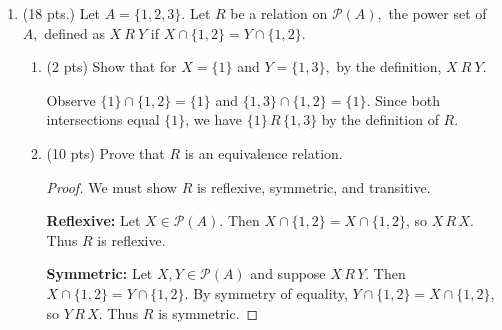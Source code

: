 \documentclass[11pt]{article}
\newcommand{\Z}{{\mathbb{Z}}}
\newcommand{\N}{{\mathbb{N}}}
\begin{document}
\begin{enumerate}
\begin{enumerate}
	\textbf{Disproof by counterexample:} Let $A = \{1\}$, $B = \{1, 2\}$, $C = \{2\}$ (within some universal set, say $U = \{1,2,3\}$). Then $A \subseteq B$. Now $B \cap C = \{2\}$, so $\overline{(B\cap C)} = \{1,3\}$. Thus $A \cap \overline{(B\cap C)} = \{1\} \cap \{1,3\} = \{1\} \neq \emptyset$. Therefore the statement is false.
	\vfill
	\item For every $n \in \N$, there exists some $m \in \N$ such that $mn \equiv 1 \pmod {10}.$
	
	\textbf{Disproof by counterexample:} Let $n = 2$. Suppose for contradiction there exists $m \in \N$ with $2m \equiv 1 \pmod{10}$. Then $10 \mid (2m - 1)$, so $2m - 1$ is divisible by $10$, hence even. But $2m - 1$ is odd, a contradiction. Thus no such $m$ exists for $n = 2$, and the statement is false.
	\vfill
	\item The relation $R$ on $\Z$ defined by $xRy$ if $|x-y| <5$ is transitive.
	
	\textbf{Disproof by counterexample:} Let $x = 0$, $y = 4$, and $z = 8$. Then $|x - y| = 4 < 5$, so $x\,R\,y$. Also $|y - z| = 4 < 5$, so $y\,R\,z$. However, $|x - z| = 8 \not< 5$, so $x\,\not R\,z$. Therefore $R$ is not transitive. 
	\vfill
	\end{enumerate}

\item (18 pts.) Let $A=\{1,2,3\}.$ Let $R$ be a relation on $\mathcal{P}(A),$ the power set of $A,$ defined as $X\: R\: Y$ if $X \cap \{1,2\} = Y \cap \{1,2\}.$
	\begin{enumerate}
	\item (2 pts) Show that for $X=\{1\}$ and $Y=\{1,3\},$ by the definition, $X\: R\: Y.$
	
	
	Observe $\{1\} \cap \{1,2\} = \{1\}$ and $\{1,3\} \cap \{1,2\} = \{1\}$. Since both intersections equal $\{1\}$, we have $\{1\}\,R\,\{1,3\}$ by the definition of $R$.
	
	
	\item (10 pts) Prove that $R$ is an equivalence relation.
	
	\begin{proof} We must show $R$ is reflexive, symmetric, and transitive.

\textbf{Reflexive:} Let $X \in \mathcal{P}(A)$. Then $X \cap \{1,2\} = X \cap \{1,2\}$, so $X\,R\,X$. Thus $R$ is reflexive.

\textbf{Symmetric:} Let $X, Y \in \mathcal{P}(A)$ and suppose $X\,R\,Y$. Then $X \cap \{1,2\} = Y \cap \{1,2\}$. By symmetry of equality, $Y \cap \{1,2\} = X \cap \{1,2\}$, so $Y\,R\,X$. Thus $R$ is symmetric.


\end{proof}
\end{enumerate}
\end{enumerate}
\end{document}
